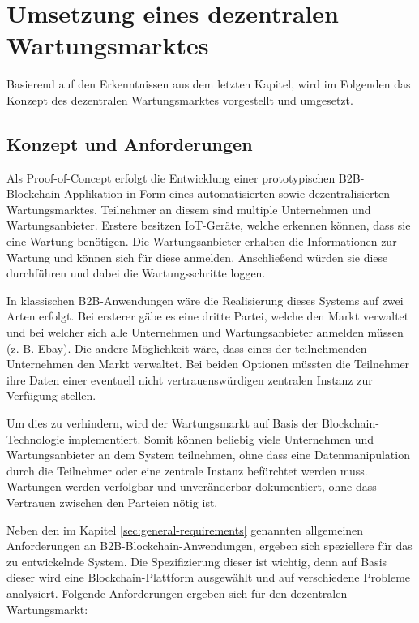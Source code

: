 \chapter{Umsetzung eines dezentralen Wartungsmarktes}
\label{cha:wartungsmarkt-impl}

Basierend auf den Erkenntnissen aus dem letzten Kapitel, wird im Folgenden das Konzept des dezentralen Wartungsmarktes vorgestellt und umgesetzt.

\section{Konzept und Anforderungen}
Als Proof-of-Concept erfolgt die Entwicklung einer prototypischen B2B-Blockchain-Applikation in Form eines automatisierten sowie dezentralisierten Wartungsmarktes. Teilnehmer an diesem sind multiple Unternehmen und Wartungsanbieter. Erstere besitzen IoT-Geräte, welche erkennen können, dass sie eine Wartung benötigen. Die Wartungsanbieter erhalten die Informationen zur Wartung und können sich für diese anmelden. Anschließend würden sie diese durchführen und dabei die Wartungsschritte loggen.  

In klassischen B2B-Anwendungen wäre die Realisierung dieses Systems auf zwei Arten erfolgt. Bei ersterer gäbe es eine dritte Partei, welche den Markt verwaltet und bei welcher sich alle Unternehmen und Wartungsanbieter anmelden müssen (z. B. Ebay). Die andere Möglichkeit wäre, dass eines der teilnehmenden Unternehmen den Markt verwaltet. Bei beiden Optionen müssten die Teilnehmer ihre Daten einer eventuell nicht vertrauenswürdigen zentralen Instanz zur Verfügung stellen.

Um dies zu verhindern, wird der Wartungsmarkt auf Basis der Blockchain-Technologie implementiert. Somit können beliebig viele Unternehmen und Wartungsanbieter an dem System teilnehmen, ohne dass eine Datenmanipulation durch die Teilnehmer oder eine zentrale Instanz befürchtet werden muss. Wartungen werden verfolgbar und unveränderbar dokumentiert, ohne dass Vertrauen zwischen den Parteien nötig ist.

Neben den im Kapitel \ref{sec:general-requirements} genannten allgemeinen Anforderungen an B2B-Blockchain-Anwendungen, ergeben sich speziellere für das zu entwickelnde System. Die Spezifizierung dieser ist wichtig, denn auf Basis dieser wird eine Blockchain-Plattform ausgewählt und auf verschiedene Probleme analysiert. Folgende Anforderungen ergeben sich für den dezentralen Wartungsmarkt:

